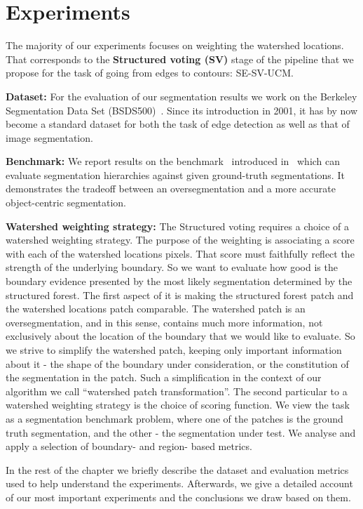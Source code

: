 \chapter{Experiments}
\label{Chapter5}
The majority of our experiments focuses on weighting the watershed locations. That corresponds to the \textbf{Structured voting (SV)} stage of the pipeline that we propose for the task of going from edges to contours: SE-SV-UCM.

\textbf{Dataset:} For the evaluation of our segmentation results we work on the Berkeley Segmentation Data Set (BSDS500)~\cite{Arbelaez11}. Since its introduction in 2001, it has by now become a standard dataset for both the task of edge detection as well as that of image segmentation.

\textbf{Benchmark:} We report results on the benchmark~\cite{Galasso13Benchmark} introduced in~\cite{Galasso13} which can evaluate segmentation hierarchies against given ground-truth segmentations. It demonstrates the tradeoff between an oversegmentation and a more accurate object-centric segmentation.

\textbf{Watershed weighting strategy:} The Structured voting requires a choice of a watershed weighting strategy. The purpose of the weighting is associating a score with each of the watershed locations pixels. That score must faithfully reflect the strength of the underlying boundary. So we want to evaluate how good is the boundary evidence presented by the most likely segmentation determined by the structured forest. 
The first aspect of it is making the structured forest patch and the watershed locations patch comparable. The watershed patch is an oversegmentation, and in this sense, contains much more information, not exclusively about the location of the boundary that we would like to evaluate. So we strive to simplify the watershed patch, keeping only important information about it - the shape of the boundary under consideration, or the constitution of the segmentation in the patch. Such a simplification in the context of our algorithm we call ``watershed patch transformation''. 
The second particular to a watershed weighting strategy is the choice of scoring function. We view the task as a segmentation benchmark problem, where one of the patches is the ground truth segmentation, and the other - the segmentation under test. We analyse and apply a selection of boundary- and region- based metrics.

In the rest of the chapter we briefly describe the dataset and evaluation metrics used to help understand the experiments. Afterwards, we give a detailed account of our most important experiments and the conclusions we draw based on them.


